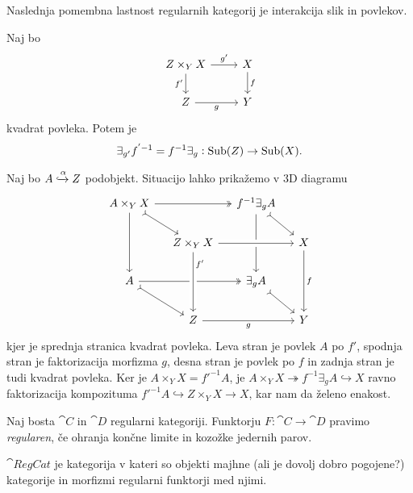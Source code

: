 \documentclass[../kategoricna_logika.tex]{subfiles}
\begin{document}
Naslednja pomembna lastnost regularnih kategorij je interakcija slik in povlekov.
\begin{lema}
  Naj bo
  \begin{equation*}
    \begin{tikzcd}
      Z \times_Y X \ar[d, "f'"'] \ar[r, "g'"] & X \ar[d, "f"] \\
      Z \ar[r, "g"'] & Y
    \end{tikzcd}
  \end{equation*}
  kvadrat povleka. Potem je
  $$\exists_{g'}f^{'-1} = f^{-1}\exists_g : \operatorname{Sub}(Z) \to \operatorname{Sub}(X).$$
\end{lema}
\begin{dokaz}
  Naj bo $A \xhookrightarrow{\alpha} Z$ podobjekt.
  Situacijo lahko prikažemo v $3$D diagramu
  \begin{equation*}
  \begin{tikzcd}[column sep=small]
    A \times_Y X \ar[dd] \ar[dr, tail] \ar[rr, two heads] & & f^{-1}\exists_g A \ar[dd] \ar[dr, tail] & \\
    & Z \times_Y X  \ar[rr, crossing over] & & X \ar[dd, "f"] \\
    A \ar[dr, tail] \ar[rr, two heads] & & \exists_g A \ar[dr, tail] & \\
    & Z \ar[rr, "g"'] \ar[from=uu, pos=0.2, crossing over, "f'"] & & Y
  \end{tikzcd}
  \end{equation*}
  kjer je sprednja stranica kvadrat povleka.
  Leva stran je povlek $A$ po $f'$, spodnja stran je faktorizacija morfizma $g$,
  desna stran je povlek po $f$ in zadnja stran je tudi kvadrat povleka.
  Ker je $A \times_Y X = f'^{-1}A$, je $A \times_Y X \twoheadrightarrow f^{-1}\exists_g A \hookrightarrow X$
  ravno faktorizacija kompozituma $f'^{-1}A \hookrightarrow Z \times_Y X \to X$, kar nam da želeno enakost.
\end{dokaz}
\begin{definicija}
  Naj bosta $\cat{C}$ in $\cat{D}$ regularni kategoriji.
  Funktorju ${F : \cat{C} \to \cat{D}}$ pravimo \emph{regularen}, če ohranja končne limite in kozožke jedernih parov.
\end{definicija}
\begin{definicija}
  $\cat{RegCat}$ je kategorija v kateri so objekti majhne (ali je dovolj dobro pogojene?) kategorije in morfizmi regularni funktorji med njimi.
\end{definicija}
\end{document}
